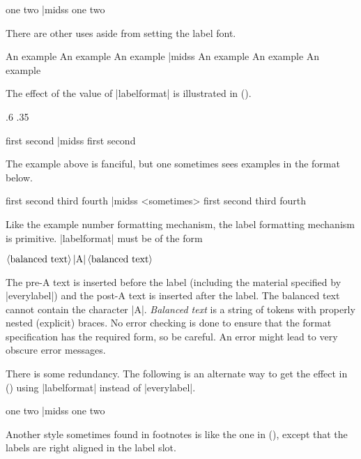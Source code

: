 \beginss
\pex[everylabel=\it]
\a one
\a two
\xe|midss
\a one
\a two
\xe
\endss

There are other uses aside from setting the label font.

\beginss
\pex[everylabel=A,labeltype=numeric,
   samplelabel=A1.]
\a An example
\a An example
\a An example
\xe|midss
\pex[everylabel=A,labeltype=numeric,
   samplelabel=A1.]
\a An example
\a An example
\a An example
\xe
\endss

The effect of the value of |labelformat| is illustrated in
(\nextx).

\setss .6 .35

\beginss
\pex[labelformat=$\langle$A$\rangle$,
   samplelabel=$\langle$a$\rangle$]
\a first
\a second
\xe|midss
\pex[labelformat=$\langle A\rangle$,
   samplelabel=$\langle A\rangle$]
\a first
\a second
\xe
\endss

The example above is fanciful, but one sometimes sees examples in the
format below.

\beginss
\pex[exnoformat=X.,labeltype=roman,
   labelformat=(A),samplelabel=(iii)]
\a first
\a second
\a third
\a fourth
\xe|midss
\pex[exnoformat=X.,labeltype=roman,
   labelformat=(A),samplelabel=(iii)]<sometimes>
\a first
\a second
\a third
\a fourth
\xe
\endss

Like the example number formatting mechanism, the label formatting
mechanism is primitive. |labelformat| must be of the form
\medskip
\centerline{$\rm \langle balanced\ text\rangle\thinspace|A|\thinspace
\langle balanced\ text\rangle$}
\medskip
\noindent The pre-A text is inserted before the label (including
the material specified by |everylabel|) and the post-A text is
inserted after the label. The balanced text cannot contain the
character |A|.  {\it Balanced text\/} is a string of tokens with
properly nested (explicit) braces. No error checking is done to
ensure that the format specification has the required form, so be
careful.  An error might lead to very obscure error messages.

There is some redundancy.  The following is an alternate way to get
the effect in () using |labelformat| instead of
|everylabel|.

\beginss
\pex[labelformat=\it A.]
\a one
\a two
\xe|midss
\pex[labelformat=\it A.]
\a one
\a two
\xe
\endss

Another style sometimes found in footnotes is like the one in
(), except that the labels are right aligned in the
label slot.


